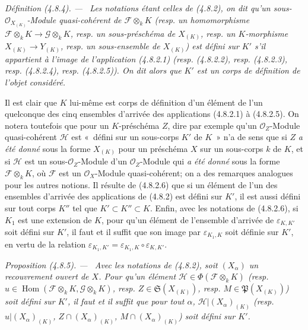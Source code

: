 \documentclass[10pt,oneside]{book}
\newenvironment{definition}[1][]{%
  \par\medskip\noindent\itshape Définition (#1). ---\ }{\par}
\newenvironment{proposition}[1][]{%
  \par\medskip\noindent\itshape Proposition (#1). ---\ }{\par}
\begin{document}
\begin{definition}[4.8.4]
\label{IV.2.4.8.4-fr}
Les notations étant celles de (4.8.2), on dit qu'un
sous-$\mathcal O_{X_{(K)}}$-Module quasi-cohérent de
$\mathscr F\otimes_kK$ (resp. un homomorphisme
$\mathscr F\otimes_kK\to\mathscr G\otimes_kK$, resp. un sous-préschéma de
$X_{(K)}$, resp. un $K$-morphisme $X_{(K)}\to Y_{(K)}$, resp. un
sous-ensemble de $X_{(K)}$) est \emph{défini sur $K'$} s'il appartient à
l'image de l'application (4.8.2.1) (resp. (4.8.2.2), resp. (4.8.2.3), resp.
(4.8.2.4), resp. (4.8.2.5)). On dit alors que $K'$ est un \emph{corps de
définition} de l'objet considéré.
\end{definition}

Il est clair que $K$ lui-même est corps de définition d'un élément de l'un
quelconque des cinq ensembles d'arrivée des applications (4.8.2.1) à
(4.8.2.5). On notera toutefois que pour un $K$-préschéma $Z$, dire par exemple
qu'un $\mathcal O_Z$-Module quasi-cohérent $\mathscr H$ est «~défini sur un
sous-corps $K'$ de $K$~» n'a de sens que si $Z$ \emph{a été donné} sous la
forme $X_{(K)}$ pour un préschéma $X$ sur un sous-corps $k$ de $K$, et si
$\mathscr H$ est un sous-$\mathcal O_Z$-Module d'un $\mathcal O_Z$-Module qui
\emph{a été donné} sous la forme $\mathscr F\otimes_kK$, où $\mathscr F$ est
un $\mathcal O_X$-Module quasi-cohérent; on a des remarques analogues pour les
autres notions. Il résulte de (4.8.2.6) que si un élément de l'un des ensembles
d'arrivée des applications de (4.8.2) est défini sur $K'$, il est aussi défini
sur tout corps $K''$ tel que $K'\subset K''\subset K$. Enfin, avec les
notations de (4.8.2.6), si $K_1$ est une extension de $K$, pour qu'un élément
de l'ensemble d'arrivée de $\varepsilon_{K,K'}$ soit défini sur $K'$, il
faut et il suffit que son image par $\varepsilon_{K_1,K}$ soit définie sur
$K'$, en vertu de la relation
$\varepsilon_{K_1,K'}=\varepsilon_{K_1,K}\circ\varepsilon_{K,K'}$.

\begin{proposition}[4.8.5]
\label{IV.2.4.8.5-fr}
Avec les notations de (4.8.2), soit $(X_\alpha)$ un recouvrement ouvert de
$X$. Pour qu'un élément $\mathscr H\in\Phi(\mathscr F\otimes_kK)$ (resp.
$u\in\operatorname{Hom}(\mathscr F\otimes_kK,\mathscr G\otimes_kK)$, resp.
$Z\in\mathfrak S(X_{(K)})$, resp. $M\in\mathfrak P(X_{(K)})$) soit défini sur
$K'$, il faut et il suffit que pour tout $\alpha$,
$\mathscr H|(X_\alpha)_{(K)}$ (resp. $u|(X_\alpha)_{(K)}$,
$Z\cap(X_\alpha)_{(K)}$, $M\cap(X_\alpha)_{(K)}$) soit défini sur $K'$.
\end{proposition}
\end{document}
